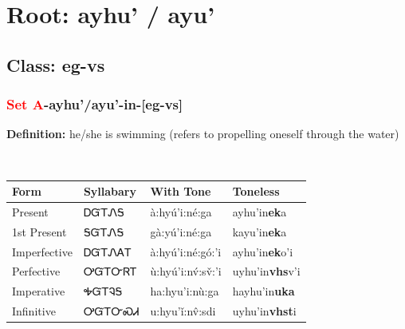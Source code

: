 \needspace{4in}
\section*{Root: ayhu' / ayu'}
\nopagebreak
{}
\needspace{3in}
\subsection*{Class: eg-vs}
\nopagebreak
\needspace{2in}
\subsubsection*{\textcolor{Red}{Set A}{-}\textbf{ayhu'/ayu'}{-}in{-}[eg-vs]}
\nopagebreak
\textbf{Definition: } he/she is swimming (refers to propelling oneself through the water)
\\[0.5em]
\begin{tabularx}{\textwidth}{l X X X}%
\toprule%
\textbf{Form}&\textbf{Syllabary}&\textbf{With Tone}&\textbf{Toneless}\\%
\midrule%
Present&ᎠᏳᎢᏁᎦ&à:hyú’i:né:ga&ayhu'in\textbf{ek}a\\%
1st Present&ᎦᏳᎢᏁᎦ&gà:yú’i:né:ga&kayu'in\textbf{ek}a\\%
Imperfective&ᎠᏳᎢᏁᎪᎢ&à:hyú’i:né:gó:’i&ayhu'in\textbf{ek}o'i\\%
Perfective&ᎤᏳᎢᏅᏒᎢ&ù:hyú’i:nv́:sv̌:’i&uyhu'in\textbf{vhs}v'i\\%
Imperative&ᎭᏳᎢᎸᎦ&ha:hyu’i:nù:ga&hayhu'in\textbf{uka}\\%
Infinitive&ᎤᏳᎢᏅᏍᏗ&u:hyu’ǐ:nv̂:sdi&uyhu'in\textbf{vhst}i\\%
\bottomrule%
\end{tabularx}
\\[1em]